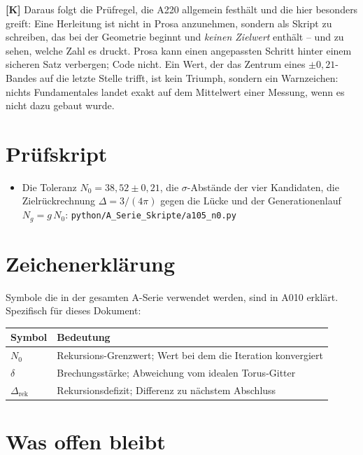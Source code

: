 \textbf{[K]} Daraus folgt die Prüfregel, die A220 allgemein festhält und die hier
besonders greift: Eine Herleitung ist nicht in Prosa anzunehmen, sondern als
Skript zu schreiben, das bei der Geometrie beginnt und \emph{keinen Zielwert}
enthält -- und zu sehen, welche Zahl es druckt. Prosa kann einen angepassten
Schritt hinter einem sicheren Satz verbergen; Code nicht. Ein Wert, der das
Zentrum eines $\pm 0{,}21$-Bandes auf die letzte Stelle trifft, ist kein Triumph,
sondern ein Warnzeichen: nichts Fundamentales landet exakt auf dem Mittelwert
einer Messung, wenn es nicht dazu gebaut wurde.

\section{Prüfskript}

\begin{itemize}
  \item Die Toleranz $N_0 = 38{,}52 \pm 0{,}21$, die $\sigma$-Abstände der vier
    Kandidaten, die Zielrückrechnung $\Delta = 3/(4\pi)$ gegen die Lücke und der
    Generationenlauf $N_g = g\,N_0$:
    \texttt{python/A\_Serie\_Skripte/a105\_n0.py}
\end{itemize}


\section{Zeichenerklärung}

Symbole die in der gesamten A-Serie verwendet werden, sind in A010 erklärt.
Spezifisch für dieses Dokument:

\begin{center}
\renewcommand{\arraystretch}{1.3}
{\small\begin{tabular}{lp{9cm}}
\toprule
Symbol & Bedeutung \\
\midrule
$N_0$ & Rekursions-Grenzwert; Wert bei dem die Iteration konvergiert \\
$\delta$ & Brechungsstärke; Abweichung vom idealen Torus-Gitter \\
$\Delta_\text{rek}$ & Rekursionsdefizit; Differenz zu nächstem Abschluss \\
\bottomrule
\end{tabular}}
\renewcommand{\arraystretch}{1.0}
\end{center}

\section{Was offen bleibt}

